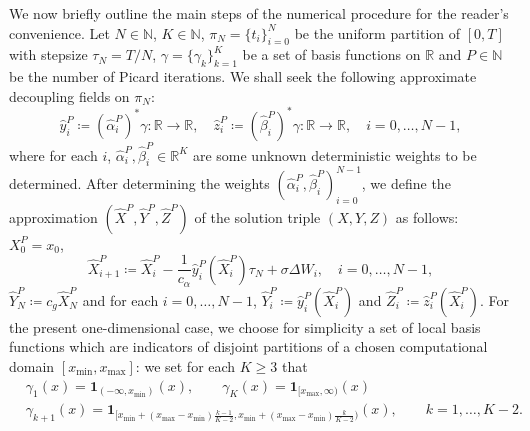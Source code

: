 \documentclass[11pt]{article}
\numberwithin{equation}{section}
\theoremstyle{definition}
\theoremstyle{remark}
\def\to{\rightarrow}
\newcommand{\q}{\quad}   \newcommand{\qq}{\qquad}
\def\l{\label}  \def\f{\frac}  \def\fa{\forall}
\def\b{\beta}  \def\a{\alpha} \def\ga{\gamma}
\def\sN{{\mathbb{N}}}
\def\sR{{\mathbb R}}
\def\bb{\begin{equation}} \def\ee{\end{equation}}
\begin{document}
We now briefly outline the main steps of the numerical procedure %
for the reader's convenience.
Let $N\in \sN$, $K\in \sN$,
$\pi_N=\{t_i \}_{i=0}^N$ be
 the uniform  partition of $[0,T]$
 with stepsize $\tau_N=T/N$,
 $\gamma = \{\gamma_k\}_{k=1}^K$
 be a set of basis functions on $\sR$
 and $P\in \sN$ be the number of Picard iterations.
We shall seek the following approximate decoupling fields  on $\pi_N$:
 $$
 \hat{y}^P_i\coloneqq ( \hat{\a}^P_i)^*\gamma :\sR\to \sR,
 \q 
 \hat{z}^P_i\coloneqq (\hat{\b}^P_i)^*\gamma: \sR\to \sR,
\q i=0,\ldots, N-1,
$$
where for each $i$,
$\hat{\a}^P_i, \hat{\b}^P_i\in \sR^K$ 
are some unknown deterministic weights to be determined.
After determining the weights
$(\hat{\a}^P_i,\hat{\b}^P_i)_{i=0}^{N-1}$,
we  define the  approximation
$(\hat{X}^P,\hat{Y}^P,\hat{Z}^P)$
of the solution triple 
$(X, Y,Z)$ as follows: $X^P_0=x_0$,
\bb\l{eq:X^P}
\hat{X}^P_{i+1} \coloneqq \hat{X}^P_i -\frac{1}{c_{\alpha}} \hat{y}^P_i(\hat{X}^P_i)\tau_N + \sigma \Delta W_i,
\q i=0,\ldots, N-1,
\ee
$\hat{Y}^P_N\coloneqq c_g\hat{X}^P_N$
and 
for each $i=0,\ldots, N-1$, 
$\hat{Y}^P_i\coloneqq \hat{y}^P_i(\hat{X}^P_i)$
and 
$\hat{Z}^P_i\coloneqq \hat{z}^P_i(\hat{X}^P_i)$.
For the present one-dimensional case, we choose for simplicity  a set of local basis functions
which are indicators  of disjoint   partitions of a chosen computational domain
$[x_{\min}, x_{\max}]$:
we set for each $K \geq 3$ that
\begin{align*}
& \gamma_1(x) = \mathbf{1}_{( -\infty, x_{\min} )}(x), \qquad \gamma_K(x) = \mathbf{1}_{ [x_{\max},\infty) }(x) \\
& \gamma_{k+1}(x) = \mathbf{1}_{  [x_{\min}+(x_{\max}-x_{\min})\frac{k-1}{K-2}, x_{\min}+(x_{\max}-x_{\min})\frac{k}{K-2}) }(x), \qquad k=1, \ldots, K-2.
\end{align*}
\end{document}
